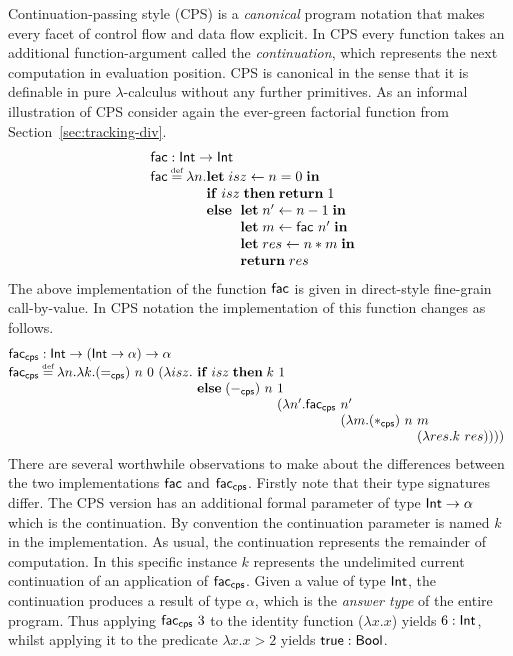\documentclass[12pt,phd,lfcs,twoside,openright,logo,leftchapter,normalheadings]{infthesis}
\theoremstyle{plain}
\theoremstyle{definition}
\begin{document}
Continuation-passing style (CPS) is a \emph{canonical} program
notation that makes every facet of control flow and data flow
explicit. In CPS every function takes an additional function-argument
called the \emph{continuation}, which represents the next computation
in evaluation position. CPS is canonical in the sense that it is
definable in pure $\lambda$-calculus without any further
primitives. As an informal illustration of CPS consider again the
ever-green factorial function from Section~\ref{sec:tracking-div}.
%
\[
  \bl
    \dec{fac} : \Int \to \Int\\
    \dec{fac} \defas \lambda n.
       \ba[t]{@{}l}
         \Let\;isz \revto n = 0\;\In\\
         \If\;isz\;\Then\; \Return\;1\\
         \Else\;\ba[t]{@{~}l}
                   \Let\; n' \revto n - 1 \;\In\\
                   \Let\; m \revto \dec{fac}~n' \;\In\\
                   \Let\;res \revto n * m \;\In\\
                   \Return\;res
                 \ea
       \ea
  \el
\]
%
The above implementation of the function $\mathsf{fac}$ is given in
direct-style fine-grain call-by-value. In CPS notation the
implementation of this function changes as follows.
%
\[
  \bl
  \dec{fac}_{\dec{cps}} : \Int \to (\Int \to \alpha) \to \alpha\\
  \dec{fac}_{\dec{cps}} \defas \lambda n.\lambda k.
     (=_{\dec{cps}})~n~0~
       (\lambda isz.
          \ba[t]{@{~}l}
          \If\;isz\;\Then\; k~1\\
          \Else\;
          (-_{\dec{cps}})~n~\bl 1\\
            (\lambda n'.
               \dec{fac}_{\dec{cps}}~\bl n'\\
               (\lambda m. (*_{\dec{cps}})~n~\bl m\\
               (\lambda res. k~res))))
               \el
               \el
               \el
          \ea
  \el
\]
%
There are several worthwhile observations to make about the
differences between the two implementations $\mathsf{fac}$ and
$\mathsf{fac}_{\mathsf{cps}}$.
%
Firstly note that their type signatures differ. The CPS version has an
additional formal parameter of type $\mathsf{Int} \to \alpha$ which is the
continuation. By convention the continuation parameter is named $k$ in
the implementation. As usual, the continuation represents the
remainder of computation. In this specific instance $k$ represents the
undelimited current continuation of an application of
$\mathsf{fac}_{\mathsf{cps}}$. Given a value of type $\mathsf{Int}$, the
continuation produces a result of type $\alpha$, which is the
\emph{answer type} of the entire program. Thus applying
$\mathsf{fac}_{\mathsf{cps}}~3$ to the identity function ($\lambda x.x$)
yields $6 : \mathsf{Int}$, whilst applying it to the predicate
$\lambda x. x > 2$ yields $\mathsf{true} : \mathsf{Bool}$.
%
\end{document}
